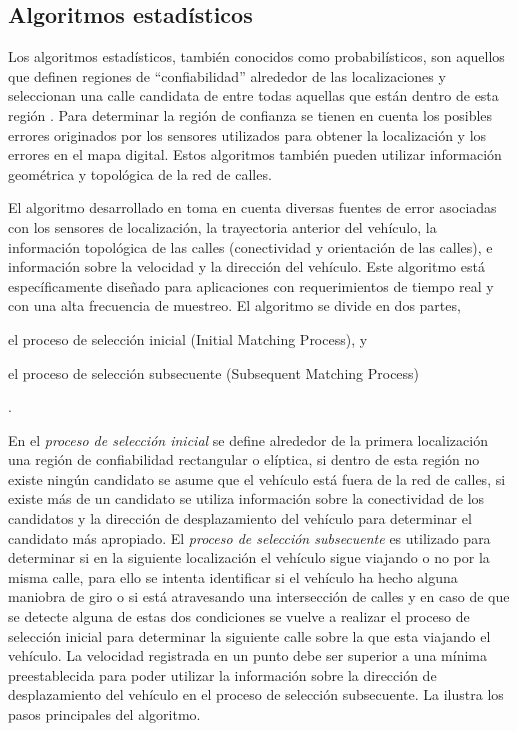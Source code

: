 \subsection{Algoritmos estadísticos}

Los algoritmos estadísticos, también conocidos como probabilísticos, son aquellos que definen regiones de “confiabilidad” alrededor de las localizaciones y seleccionan una calle candidata de entre todas aquellas que están dentro de esta región \citep{quddus2007current}. Para determinar la región de confianza se tienen en cuenta los posibles errores originados por los sensores utilizados para obtener la localización y los errores en el mapa digital. Estos algoritmos también pueden utilizar información geométrica y topológica de la red de calles.

El algoritmo desarrollado en \citep{ochieng2009map} toma en cuenta diversas fuentes de error asociadas con los sensores de localización, la trayectoria anterior del vehículo, la información topológica de las calles (conectividad y orientación de las calles), e información sobre la velocidad y la dirección del vehículo. Este algoritmo está específicamente diseñado para aplicaciones con requerimientos de tiempo real y con una alta frecuencia de muestreo. El algoritmo se divide en dos partes, \begin{enumerate*}[a)]
\item el proceso de selección inicial (Initial Matching Process), y \item el proceso de selección subsecuente (Subsequent Matching Process)\end{enumerate*}. 

En el \emph{proceso de selección inicial} se define alrededor de la primera localización una región de confiabilidad rectangular o elíptica, si dentro de esta región no existe ningún candidato se asume que el vehículo está fuera de la red de calles, si existe más de un candidato se utiliza información sobre la conectividad de los candidatos y la dirección de desplazamiento del vehículo para determinar el candidato más apropiado. El \emph{proceso de selección  subsecuente} es utilizado para determinar si en la siguiente localización el vehículo sigue viajando o no por la misma calle, para ello se intenta identificar si el vehículo ha hecho alguna maniobra de giro o si está atravesando una intersección de calles y en caso de que se detecte alguna de estas dos condiciones se vuelve a realizar el proceso de selección inicial para determinar la siguiente calle sobre la que esta viajando el vehículo. La velocidad registrada en un punto debe ser superior a una mínima preestablecida para poder utilizar la información sobre la dirección de desplazamiento del vehículo en el proceso de selección subsecuente. La  ilustra los pasos principales del algoritmo.

